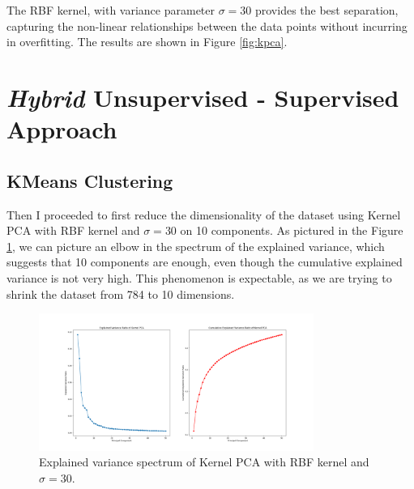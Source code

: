 \documentclass[a4paper, 10pt]{article}
\begin{document}
The RBF kernel, with variance parameter $\sigma = 30$ provides the best separation, capturing the non-linear relationships 
between the data points without incurring in overfitting.
The results are shown in Figure \ref{fig:kpca}.

\section{\textit{Hybrid} Unsupervised - Supervised Approach}
\subsection{KMeans Clustering}
Then I proceeded to first reduce the dimensionality of the dataset using Kernel PCA with RBF kernel and $\sigma = 30$ on 10 components. As pictured in the
Figure \ref{fig:kpca_spectrum}, we can picture an elbow in the spectrum of the explained variance, which suggests that 10 components are enough, even though
the cumulative explained variance is not very high. This phenomenon is expectable, as we are trying to shrink the dataset from 784 to 10 dimensions.

\begin{figure}[ht]
    \centering
    \includegraphics[width=0.8\textwidth]{images/kpca_spectrum.png}
    \caption{Explained variance spectrum of Kernel PCA with RBF kernel and $\sigma = 30$.}
    \label{fig:kpca_spectrum}
\end{figure}
\end{document}
